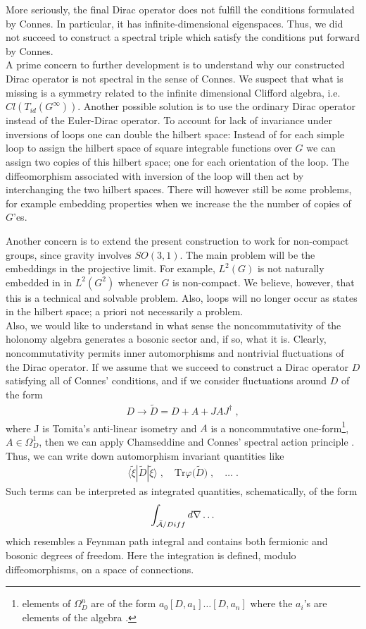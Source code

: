 \documentclass[12pt]{article}
\newcommand{\ba}{\begin{eqnarray}}
\newcommand{\ea}{\end{eqnarray}}
\def\ca{{\cal A}}
\begin{document}
More seriously, the final Dirac operator does not fulfill the conditions
formulated by 
Connes. In particular, it has infinite-dimensional eigenspaces. 
Thus, we did not succeed to construct a spectral triple which satisfy the
conditions put forward by Connes.\\


A prime concern to further development is to understand why our
constructed Dirac operator is not spectral in the sense of Connes. We suspect
that what is missing is a symmetry related to the infinite dimensional
Clifford algebra, i.e. $Cl(T_{id}(G^\infty))$. Another possible solution is to
use the ordinary Dirac operator instead of the Euler-Dirac operator. To
account for lack of invariance under inversions of loops one can double the
hilbert space: Instead of for each simple loop to assign the hilbert space of
square integrable functions over $G$ we can assign two copies of this hilbert
space; one for each orientation of the loop. The diffeomorphism associated
with inversion of the loop will then act by interchanging the two hilbert
spaces. There will however still be some problems, for example embedding
properties when we increase the the number of copies of $G$'es.

Another concern is to extend the present construction to work for non-compact
groups, since gravity involves $SO(3,1)$. The main problem will be the embeddings in the projective limit. For example, $L^2(G)$
is not naturally embedded in in $L^2(G^2)$ whenever $G$ is non-compact. We believe, however, that this is
a technical and solvable problem. Also, loops will no longer occur as
states in the hilbert space; a priori not necessarily a problem. \\

Also, we would like to understand in what sense the noncommutativity of the
holonomy algebra generates a bosonic sector and, if so, what it is. Clearly,
noncommutativity permits inner automorphisms and nontrivial fluctuations of
the Dirac operator. If we assume that we succeed to construct a Dirac operator $D$
satisfying all of Connes' conditions, and if we consider fluctuations around $D$ of the form
\ba
D\to \tilde{D} = D + A + J A J^\dagger\;,
\nonumber
\ea
where J is Tomita's anti-linear isometry \cite{Ta} and $A$ is a noncommutative
one-form\footnote{elements of $\Omega^n_D$ are of the form $a_0
  [D,a_1]\ldots [D,a_n]$ where the $a_i$'s are elements of the algebra \cite{Connes:1996gi}.}, $A\in\Omega^1_D$,
 then we can apply Chamseddine and Connes'
spectral action principle \cite{Chamseddine:1991qh,Chamseddine:1996rw}. Thus,
we can write down automorphism invariant quantities like
\ba
\langle \tilde{\xi}| \tilde{D} | \tilde{\xi}\rangle\;,\quad
\mbox{Tr} \varphi \big(\tilde{D}\big) \;,\quad\ldots \;.
\nonumber
\ea
Such terms can be interpreted as integrated quantities, schematically, of the form
\[
\int_{\bar{\ca}/Diff}d\nabla \ldots
\]
which resembles a Feynman path integral and
contains both fermionic and bosonic degrees of freedom. Here the
integration is defined, modulo diffeomorphisms, on a space of connections.  \\
\end{document}
